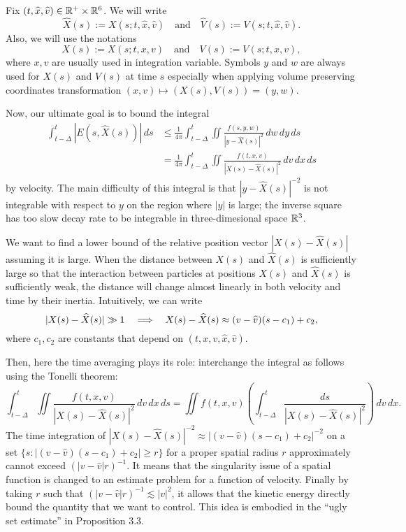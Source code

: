 \documentclass[12pt]{article}
\begin{document}
\begin{notn*}
Fix $(t,\widehat x,\widehat v)\in\mathbb{R}^+\times\mathbb{R}^6$.
We will write
\[\hat X(s):=X(s;t,\hat x,\hat v)\quad\text{and}\quad\hat V(s):=V(s;t,\hat x,\hat v).\]
Also, we will use the notations
\[X(s):=X(s;t,x,v)\quad\text{and}\quad V(s):=V(s;t,x,v),\]
where $x,v$ are usually used in integration variable.
Symbols $y$ and $w$ are always used for $X(s)$ and $V(s)$ at time $s$ especially when applying volume preserving coordinates transformation $(x,v)\mapsto(X(s),V(s))=(y,w)$.
\end{notn*}

Now, our ultimate goal is to bound the integral
\begin{align*}
\int_{t-\Delta}^t|E(s,\hat X(s))|\,ds
&\le\frac1{4\pi}\int_{t-\Delta}^t\iint\frac{f(s,y,w)}{|y-\hat X(s)|^2}\,dw\,dy\,ds\\
&=\frac1{4\pi}\int_{t-\Delta}^t\iint\frac{f(t,x,v)}{|X(s)-\hat X(s)|^2}\,dv\,dx\,ds
\end{align*}
by velocity.
The main difficulty of this integral is that $|y-\hat X(s)|^{-2}$ is not integrable with respect to $y$ on the region where $|y|$ is large; the inverse square has too slow decay rate to be integrable in three-dimesional space $\mathbb{R}^3$.

We want to find a lower bound of the relative position vector $|X(s)-\hat X(s)|$ assuming it is large.
When the distance between $X(s)$ and $\hat X(s)$ is sufficiently large so that the interaction between particles at positions $X(s)$ and $\hat X(s)$ is sufficiently weak, the distance will change almost linearly in both velocity and time by their inertia.
Intuitively, we can write
\[|X(s)-\hat X(s)|\gg1\impl X(s)-\hat X(s)\approx (v-\hat v)(s-c_1)+c_2,\]
where $c_1,c_2$ are constants that depend on $(t,x,v,\hat x,\hat v)$.

Then, here the time averaging plays its role: interchange the integral as follows using the Tonelli theorem:
\[\int_{t-\Delta}^t\iint\frac{f(t,x,v)}{|X(s)-\hat X(s)|^2}\,dv\,dx\,ds=\iint f(t,x,v)\left(\int_{t-\Delta}^t\frac{ds}{|X(s)-\hat X(s)|^2}\right)\,dv\,dx.\]
The time integration of $|X(s)-\hat X(s)|^{-2}\approx|(v-\hat v)(s-c_1)+c_2|^{-2}$ on a set $\{s:|(v-\hat v)(s-c_1)+c_2|\ge r\}$ for a proper spatial radius $r$ approximately cannot exceed $(|v-\hat v|r)^{-1}$.
It means that the singularity issue of a spatial function is changed to an estimate problem for a function of velocity.
Finally by taking $r$ such that $(|v-\hat v|r)^{-1}\lesssim|v|^2$, it allows that the kinetic energy directly bound the quantity that we want to control.
This idea is embodied in the ``ugly set estimate'' in Proposition 3.3.
\end{document}
